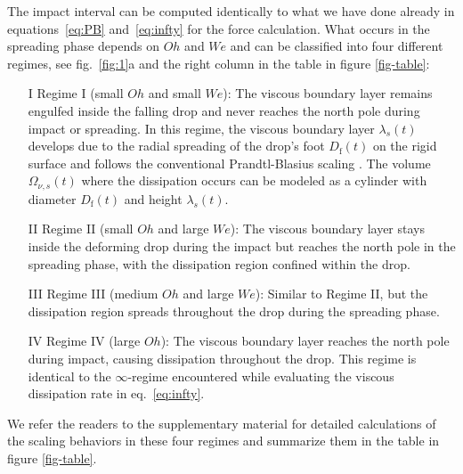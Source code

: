 \documentclass[preprint,amssymb,superscriptaddress,aps,prl,floatfix]{revtex4-1}
\begin{document}
The impact interval can be computed identically to what we have done already in equations~\eqref{eq:PB} and~\eqref{eq:infty} for the force calculation.  
What occurs in 
 the spreading phase depends on $Oh$ and $We$ and 
 can be classified into four different 
 regimes, see fig.~\ref{fig:1}a and the right column
 in the table in figure \ref{fig-table}:
\begin{enumerate}
    \item[I] Regime I (small $Oh$ and small $We$): 
    The viscous boundary layer remains engulfed inside the falling drop and never reaches the north pole during impact or spreading. In this regime, the viscous boundary layer $\lambda_s(t)$ develops due to the radial spreading of the drop's foot $D_{\text{f}}(t)$ on the rigid surface and follows the conventional Prandtl-Blasius scaling \cite{Prandtl1905, Blasius1908,Schlichting1979}. The volume $\Omega_{\nu, s}(t)$ where the dissipation occurs can be modeled as a cylinder with diameter $D_{\text{f}}(t)$ and height $\lambda_s(t)$.

    \item[II] Regime II (small $Oh$ and large $We$): The viscous boundary layer stays inside the deforming drop during the impact but reaches the north pole in the spreading phase, with the dissipation region confined within the drop.

    \item[III] Regime III (medium $Oh$ and large $We$): Similar to Regime II, but the dissipation region spreads throughout the drop during the spreading phase.

    \item[IV]  Regime IV (large $Oh$): The viscous boundary layer reaches the north pole during impact, causing dissipation throughout the drop. This regime is identical to the $\infty$-regime encountered while evaluating the viscous dissipation rate in eq.~\eqref{eq:infty}.
\end{enumerate}
We refer the readers to the supplementary material \cite{supplMaterial} for detailed calculations of the scaling behaviors in these four regimes and summarize them in the 
table in figure 
\ref{fig-table}. 
\end{document}
